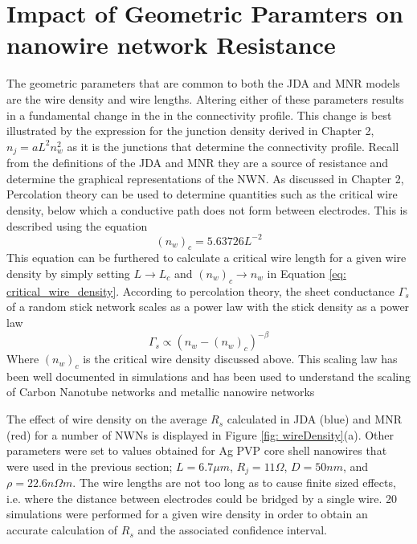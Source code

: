 \section{Impact of Geometric Paramters on nanowire network Resistance}
\label{Sec: geometric_properties}
The geometric parameters that are common to both the JDA and MNR models are the wire density and wire lengths. Altering either of these parameters results in a fundamental change in the in the connectivity profile. This change is best illustrated by the expression for the junction density derived in Chapter 2, $n_j = a L^2 n_w^2$ as it is the junctions that determine the connectivity profile. Recall from the definitions of the JDA and MNR they are a source of resistance and determine the graphical representations of the NWN. As discussed in Chapter 2, Percolation theory can be used to determine quantities such as the critical wire density, below which a conductive path does not form between electrodes. This is described using the equation 
\begin{equation}
(n_w)_c = 5.63726 L^{-2}
\label{eq: critical_wire_density}
\end{equation}
This equation can be furthered to calculate a critical wire length for a given wire density by simply setting $L \rightarrow L_c$ and $(n_w)_c \rightarrow n_w$ in Equation \ref{eq: critical_wire_density}. 
According to percolation theory, the sheet conductance $\Gamma_s$ of a random stick network scales as a power law with the stick density as a power law
\begin{equation}
\Gamma_s \propto (n_w - (n_w)_c)^{-\beta}
\label{eq: percolation_scaling}
\end{equation}
Where $(n_w)_c$ is the critical wire density discussed above. This scaling law has been well documented in simulations\cite{pike1974,li2009,zezelj2012} and has been used to understand the scaling of Carbon Nanotube networks and metallic nanowire networks\cite{hu2004,bergin2012}

The effect of wire density on the average $R_s$ calculated in JDA (blue) and MNR (red) for a number of NWNs is displayed in Figure \ref{fig: wireDensity}(a). Other parameters were set to values obtained for Ag PVP core shell nanowires\cite{rocha2015} that were used in the previous section; $L = 6.7 \mu m$, $R_j = 11 \Omega$, $D = 50 n m$, and $\rho = 22.6n\Omega m$. The wire lengths are not too long as to cause finite sized effects, i.e. where the distance between electrodes could be bridged by a single wire. 20 simulations were performed for a given wire density in order to obtain an accurate calculation of $R_s$ and the associated confidence interval. 

